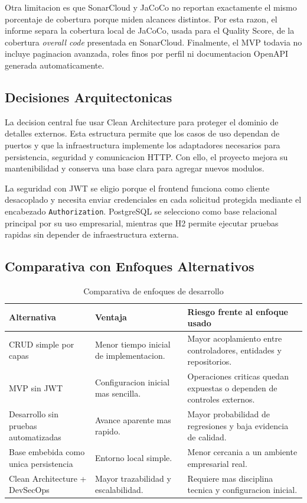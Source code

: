 \documentclass[11pt,oneside]{article}
\begin{document}
Otra limitacion es que SonarCloud y JaCoCo no reportan exactamente el mismo porcentaje de cobertura porque miden alcances distintos. Por esta razon, el informe separa la cobertura local de JaCoCo, usada para el Quality Score, de la cobertura \textit{overall code} presentada en SonarCloud. Finalmente, el MVP todavia no incluye paginacion avanzada, roles finos por perfil ni documentacion OpenAPI generada automaticamente.

\subsection{Decisiones Arquitectonicas}

La decision central fue usar Clean Architecture para proteger el dominio de detalles externos. Esta estructura permite que los casos de uso dependan de puertos y que la infraestructura implemente los adaptadores necesarios para persistencia, seguridad y comunicacion HTTP. Con ello, el proyecto mejora su mantenibilidad y conserva una base clara para agregar nuevos modulos.

La seguridad con JWT se eligio porque el frontend funciona como cliente desacoplado y necesita enviar credenciales en cada solicitud protegida mediante el encabezado \texttt{Authorization}. PostgreSQL se selecciono como base relacional principal por su uso empresarial, mientras que H2 permite ejecutar pruebas rapidas sin depender de infraestructura externa.

\subsection{Comparativa con Enfoques Alternativos}

\begin{table}[H]
\centering
\small
\caption{Comparativa de enfoques de desarrollo}
\begin{tabularx}{\textwidth}{p{}Yp{.31\textwidth}}
\toprule
Alternativa & Ventaja & Riesgo frente al enfoque usado\\
\midrule
CRUD simple por capas & Menor tiempo inicial de implementacion. & Mayor acoplamiento entre controladores, entidades y repositorios.\\
MVP sin JWT & Configuracion inicial mas sencilla. & Operaciones criticas quedan expuestas o dependen de controles externos.\\
Desarrollo sin pruebas automatizadas & Avance aparente mas rapido. & Mayor probabilidad de regresiones y baja evidencia de calidad.\\
Base embebida como unica persistencia & Entorno local simple. & Menor cercania a un ambiente empresarial real.\\
Clean Architecture + DevSecOps & Mayor trazabilidad y escalabilidad. & Requiere mas disciplina tecnica y configuracion inicial.\\
\bottomrule
\end{tabularx}
\end{table}
\end{document}
